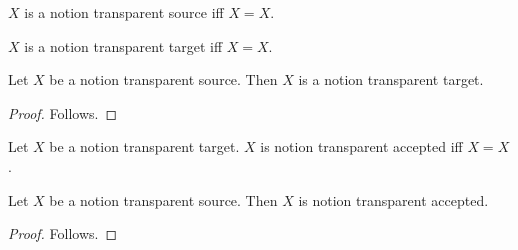 \begin{abbreviation}\label{notion_transparent_source}
    $X$ is a notion transparent source iff $X=X$.
\end{abbreviation}

\begin{definition}\label{notion_transparent_target}
    $X$ is a notion transparent target iff $X=X$.
\end{definition}

\begin{classification}\label{notion_transparent_source_is_target}
    Let $X$ be a notion transparent source.
    Then $X$ is a notion transparent target.
\end{classification}
\begin{proof}
    Follows.
\end{proof}

\begin{definition}\label{notion_transparent_accepted}
    Let $X$ be a notion transparent target.
    $X$ is notion transparent accepted iff $X=X$.
\end{definition}

\begin{proposition}\label{notion_transparent_view_use}
    Let $X$ be a notion transparent source.
    Then $X$ is notion transparent accepted.
\end{proposition}
\begin{proof}
    Follows.
\end{proof}

